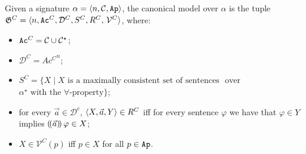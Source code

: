 \documentclass[sigconf,anonymous]{aamas}
\begin{document}
    


\begin{definition}
\label{def:can_model}
Given a signature $\alpha=\langle n,\mathcal{C}, \texttt{Ap} \rangle$, 
the canonical model over $\alpha$ is the tuple $\G^C=\tuple{n, \Ac^C,\mathcal{D}^C, S^C, R^C,$    $\mathcal{V}^C}$, where: 

\begin{itemize}
    \item $\texttt{Ac}^C=\mathcal{C}\cup \mathcal{C}^\star$;
   
    \item $\mathcal{D}^C = {Ac^C}^n $;
     \item $S^C = \{X \mid X \text{ is a maximally consistent set of sentences}$ $\text{ over }$ $\alpha^\star \text{ with the } \forall\text{-property}\}$;
    \item for every $\vec{a}\in \mathcal{D}^c$, $\langle X,\vec{a}, Y \rangle\in R^C$ iff for every sentence $\varphi$  we have that $\varphi\in Y$ implies $(\!( \vec{a} )\!)\,\varphi \in X$;
    \item $X \in \mathcal{V}^C(p)$ iff $p\in X$ for all $p \in \texttt{Ap}$. 
\end{itemize}
\end{definition}
\end{document}
